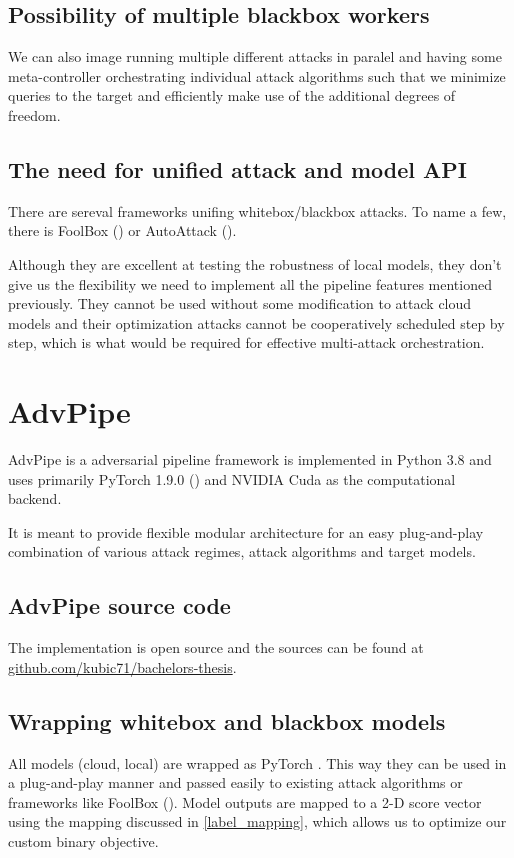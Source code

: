 \subsection{Possibility of multiple blackbox workers}
We can also image running multiple different attacks in paralel and having some meta-controller orchestrating individual attack algorithms such that we minimize queries to the target and efficiently make use of the additional degrees of freedom.


\subsection{The need for unified attack and model API}
There are sereval frameworks unifing whitebox/blackbox attacks. To name a few, there is 
FoolBox (\cite{Rauber2020FoolboxNF}) or AutoAttack (\cite{croce2020reliable}). 

Although they are excellent at testing the robustness of local models, they don't give us the flexibility we need to implement all the pipeline features mentioned previously. They cannot be used without some modification to attack cloud models and their optimization attacks cannot be cooperatively scheduled step by step, which is what would be required for effective multi-attack orchestration.

\section{AdvPipe}
AdvPipe is a adversarial pipeline framework is implemented in Python 3.8 and uses primarily PyTorch 1.9.0 (\cite{paszke2019pytorch}) and NVIDIA Cuda as the computational backend.

It is meant to provide flexible modular architecture for an easy plug-and-play combination of various attack regimes, attack algorithms and target models.

\subsection{AdvPipe source code}
The implementation is open source and the sources can be found at \href{https://github.com/kubic71/bachelors-thesis}{github.com/kubic71/bachelors-thesis}.


\subsection{Wrapping whitebox and blackbox models}
All models (cloud, local) are wrapped as PyTorch . This way they can be used in a plug-and-play manner and passed easily to existing attack algorithms or frameworks like FoolBox (\cite{Rauber2020FoolboxNF}). Model outputs are mapped to a 2-D score vector using the mapping discussed in \ref{label_mapping}, which allows us to optimize our custom binary objective.


